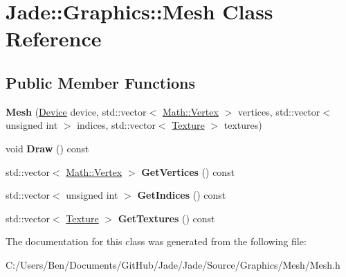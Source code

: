 \hypertarget{class_jade_1_1_graphics_1_1_mesh}{}\section{Jade\+:\+:Graphics\+:\+:Mesh Class Reference}
\label{class_jade_1_1_graphics_1_1_mesh}
\subsection*{Public Member Functions}
\begin{DoxyCompactItemize}
\item 
\hypertarget{class_jade_1_1_graphics_1_1_mesh_ad5f7ba9161f62ecdfa2e7011cbf6c091}{}{\bfseries Mesh} (\hyperlink{class_jade_1_1_graphics_1_1_device}{Device} device, std\+::vector$<$ \hyperlink{struct_jade_1_1_math_1_1_vertex}{Math\+::\+Vertex} $>$ vertices, std\+::vector$<$ unsigned int $>$ indices, std\+::vector$<$ \hyperlink{class_jade_1_1_graphics_1_1_texture}{Texture} $>$ textures)\label{class_jade_1_1_graphics_1_1_mesh_ad5f7ba9161f62ecdfa2e7011cbf6c091}

\item 
\hypertarget{class_jade_1_1_graphics_1_1_mesh_aab6996e51de3121c2aa0630208d2c344}{}void {\bfseries Draw} () const \label{class_jade_1_1_graphics_1_1_mesh_aab6996e51de3121c2aa0630208d2c344}

\item 
\hypertarget{class_jade_1_1_graphics_1_1_mesh_adf39469f8cb0a2f524418b2d16e4fa40}{}std\+::vector$<$ \hyperlink{struct_jade_1_1_math_1_1_vertex}{Math\+::\+Vertex} $>$ {\bfseries Get\+Vertices} () const \label{class_jade_1_1_graphics_1_1_mesh_adf39469f8cb0a2f524418b2d16e4fa40}

\item 
\hypertarget{class_jade_1_1_graphics_1_1_mesh_af688624627e5e0717e76553f7c7dbbae}{}std\+::vector$<$ unsigned int $>$ {\bfseries Get\+Indices} () const \label{class_jade_1_1_graphics_1_1_mesh_af688624627e5e0717e76553f7c7dbbae}

\item 
\hypertarget{class_jade_1_1_graphics_1_1_mesh_ae14dfe06d6aa2801add2af78a901844d}{}std\+::vector$<$ \hyperlink{class_jade_1_1_graphics_1_1_texture}{Texture} $>$ {\bfseries Get\+Textures} () const \label{class_jade_1_1_graphics_1_1_mesh_ae14dfe06d6aa2801add2af78a901844d}

\end{DoxyCompactItemize}


The documentation for this class was generated from the following file\+:\begin{DoxyCompactItemize}
\item 
C\+:/\+Users/\+Ben/\+Documents/\+Git\+Hub/\+Jade/\+Jade/\+Source/\+Graphics/\+Mesh/Mesh.\+h\end{DoxyCompactItemize}
